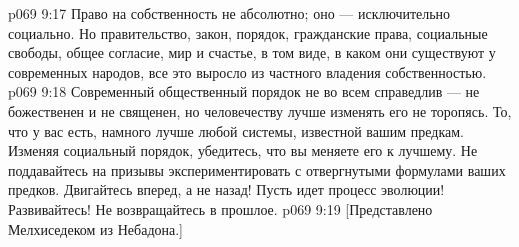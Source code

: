 \vs p069 9:17 Право на собственность не абсолютно; оно --- исключительно социально. Но правительство, закон, порядок, гражданские права, социальные свободы, общее согласие, мир и счастье, в том виде, в каком они существуют у современных народов, все это выросло из частного владения собственностью.
\vs p069 9:18 Современный общественный порядок не во всем справедлив --- не божественен и не священен, но человечеству лучше изменять его не торопясь. То, что у вас есть, намного лучше любой системы, известной вашим предкам. Изменяя социальный порядок, убедитесь, что вы меняете его к лучшему. Не поддавайтесь на призывы экспериментировать с отвергнутыми формулами ваших предков. Двигайтесь вперед, а не назад! Пусть идет процесс эволюции! Развивайтесь! Не возвращайтесь в прошлое.
\vs p069 9:19 [Представлено Мелхиседеком из Небадона.]
